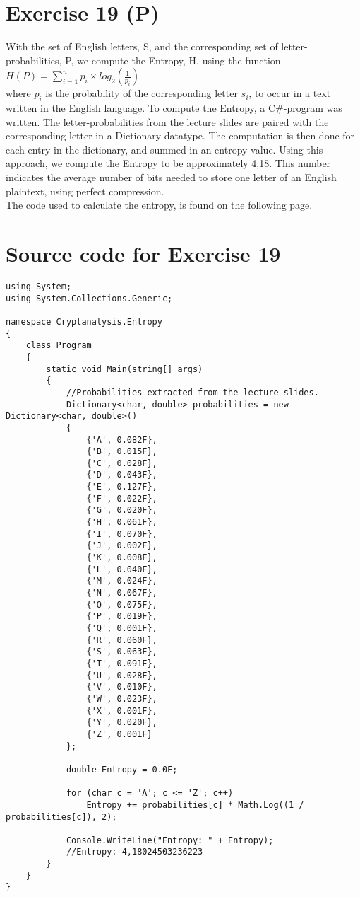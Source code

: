 \section{Exercise 19 (P)}

With the set of English letters, S, and the corresponding set of letter-probabilities, P, we compute the Entropy, H, using the function\\
$H(P) = \sum_{i=1}^{n} p_i \times log_2(\frac{1}{p_i}) $\\
where $p_i$ is the probability of the corresponding letter $s_i$, to occur in a text written in the English language.
To compute the Entropy, a C\#-program was written. The letter-probabilities from the lecture slides are paired with the corresponding letter in a Dictionary-datatype. The computation is then done for each entry in the dictionary, and summed in an entropy-value. Using this approach, we compute the Entropy to be approximately 4,18. This number indicates the average number of bits needed to store one letter of an English plaintext, using perfect compression. \\
The code used to calculate the entropy, is found on the following page.

\newpage
\section{Source code for Exercise 19}
\begin{lstlisting}
using System;
using System.Collections.Generic;

namespace Cryptanalysis.Entropy
{
    class Program
    {
        static void Main(string[] args)
        {
            //Probabilities extracted from the lecture slides.
            Dictionary<char, double> probabilities = new Dictionary<char, double>()
            {
                {'A', 0.082F},
                {'B', 0.015F},
                {'C', 0.028F},
                {'D', 0.043F},
                {'E', 0.127F},
                {'F', 0.022F},
                {'G', 0.020F},
                {'H', 0.061F},
                {'I', 0.070F},
                {'J', 0.002F},
                {'K', 0.008F},
                {'L', 0.040F},
                {'M', 0.024F},
                {'N', 0.067F},
                {'O', 0.075F},
                {'P', 0.019F},
                {'Q', 0.001F},
                {'R', 0.060F},
                {'S', 0.063F},
                {'T', 0.091F},
                {'U', 0.028F},
                {'V', 0.010F},
                {'W', 0.023F},
                {'X', 0.001F},
                {'Y', 0.020F},
                {'Z', 0.001F}
            };

            double Entropy = 0.0F;

            for (char c = 'A'; c <= 'Z'; c++)
                Entropy += probabilities[c] * Math.Log((1 / probabilities[c]), 2);

            Console.WriteLine("Entropy: " + Entropy);
            //Entropy: 4,18024503236223
        }
    }
}

\end{lstlisting}